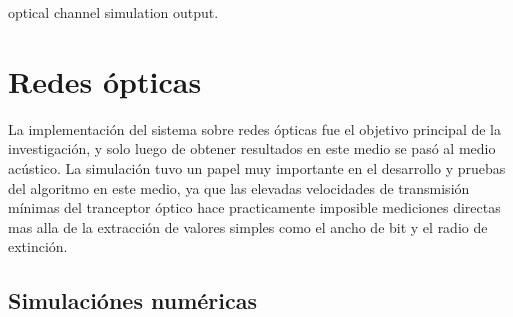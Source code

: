 optical channel simulation output. 


\section{Redes ópticas}
La implementación del sistema sobre redes ópticas fue el objetivo principal de la investigación, y solo luego de obtener resultados en este medio se pasó al medio acústico.
La simulación tuvo un papel muy importante en el desarrollo y pruebas del algoritmo en este medio, ya que las elevadas velocidades de transmisión mínimas del tranceptor óptico hace practicamente imposible mediciones directas mas alla de la extracción de valores simples como el ancho de bit y el radio de extinción.
\subsection{Simulaciónes numéricas}

